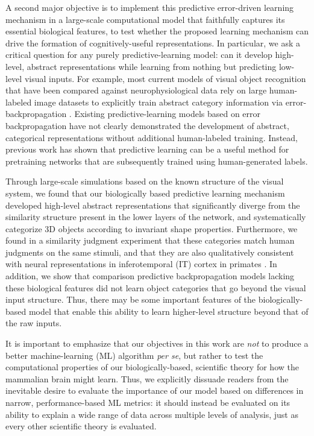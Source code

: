 \documentclass[11pt,twoside]{article}
\newif\myifpdf
\begin{document}
A second major objective is to implement this predictive error-driven learning mechanism in a large-scale computational model that faithfully captures its essential biological features, to test whether the proposed learning mechanism can drive the formation of cognitively-useful representations.  In particular, we ask a critical question for any purely predictive-learning model: can it develop high-level, abstract representations while learning from nothing but predicting low-level visual inputs.  For example, most current models of visual object recognition that have been compared against neurophysiological data rely on large human-labeled image datasets to explicitly train abstract category information via error-backpropagation \citep{CadieuHongYaminsEtAl14,RajalinghamIssaBashivanEtAl18}.  Existing predictive-learning models based on error backpropagation \citep{LotterKreimanCox16} have not clearly demonstrated the development of abstract, categorical representations without additional human-labeled training.  Instead, previous work has shown that predictive learning can be a useful method for pretraining networks that are subsequently trained using human-generated labels.

Through large-scale simulations based on the known structure of the visual system, we found that our biologically based predictive learning mechanism developed high-level abstract representations that significantly diverge from the similarity structure present in the lower layers of the network, and systematically categorize 3D objects according to invariant shape properties.  Furthermore, we found in a similarity judgment experiment that these categories match human judgments on the same stimuli, and that they are also qualitatively consistent with neural representations in inferotemporal (IT) cortex in primates \citep{CadieuHongYaminsEtAl14}.  In addition, we show that comparison predictive backpropagation models lacking these biological features \citep{LotterKreimanCox16} did not learn object categories that go beyond the visual input structure.  Thus, there may be some important features of the biologically-based model that enable this ability to learn higher-level structure beyond that of the raw inputs.

It is important to emphasize that our objectives in this work are \emph{not} to produce a better machine-learning (ML) algorithm \emph{per se}, but rather to test the computational properties of our biologically-based, scientific theory for how the mammalian brain might learn.  Thus, we explicitly dissuade readers from the inevitable desire to evaluate the importance of our model based on differences in narrow, performance-based ML metrics: it should instead be evaluated on its ability to explain a wide range of data across multiple levels of analysis, just as every other scientific theory is evaluated.
\end{document}
